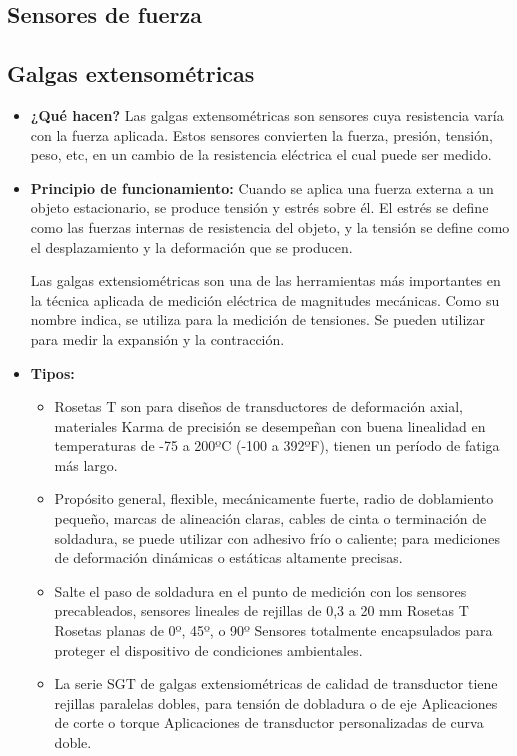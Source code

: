 \subsection{Sensores de fuerza}

\subsection*{Galgas extensométricas}
\begin{itemize}
	\item \textbf{¿Qué hacen?} Las galgas extensométricas son sensores cuya resistencia varía con la fuerza aplicada. Estos sensores convierten la fuerza, presión, tensión, peso, etc, en un cambio de la resistencia eléctrica el cual puede ser medido.
	\item \textbf{Principio de funcionamiento:} Cuando se aplica una fuerza externa a un objeto estacionario, se produce tensión y estrés sobre él. El estrés se define como las fuerzas internas de resistencia del objeto, y la tensión se define como el desplazamiento y la deformación que se producen.
	
	Las galgas extensiométricas son una de las herramientas más importantes en la técnica aplicada de medición eléctrica de magnitudes mecánicas. Como su nombre indica, se utiliza para la medición de tensiones. Se pueden utilizar para medir la expansión y la contracción.
	\item \textbf{Tipos:}
	\begin{itemize}
		\item {} Rosetas T son para diseños de transductores de deformación axial, materiales Karma de precisión se desempeñan con buena linealidad en temperaturas de -75 a 200ºC (-100 a 392ºF), tienen un período de fatiga más largo.
		\item {} Propósito general, flexible, mecánicamente fuerte, radio de doblamiento pequeño, marcas de alineación claras, cables de cinta o terminación de soldadura, se puede utilizar con adhesivo frío o caliente; para mediciones de deformación dinámicas o estáticas altamente precisas.
		\item {} Salte el paso de soldadura en el punto de medición con los sensores precableados, sensores lineales de rejillas de 0,3 a 20 mm
		Rosetas T
		Rosetas planas de 0º, 45º, o 90º
		Sensores totalmente encapsulados para proteger el dispositivo de condiciones ambientales.
		\item {} La serie SGT de galgas extensiométricas de calidad de transductor tiene rejillas paralelas dobles, para tensión de dobladura o de eje
		Aplicaciones de corte o torque
		Aplicaciones de transductor personalizadas de curva doble. \cite{Omega_GalgasExtensiometricas}
	\end{itemize}
\end{itemize}

